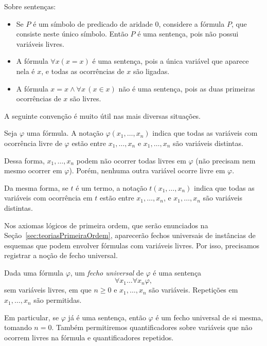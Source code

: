 \begin{example}\label{exa:sentencas}Sobre sentenças:
\begin{itemize}
        \item Se $P$ é um símbolo de predicado de aridade $0$, considere a fórmula $P$, que consiste neste único símbolo.
        Então $P$ é uma sentença, pois não possui variáveis livres.
    
        \item A fórmula $\forall x (x = x)$ é uma sentença, pois a única variável que aparece nela é $x$, e todas as ocorrências de $x$ são ligadas.
    
        \item A fórmula $x = x \wedge \forall x \,(x \in x)$ não é uma sentença, pois as duas primeiras ocorrências de $x$ são livres.
\end{itemize}
\end{example}

A seguinte convenção é muito útil nas mais diversas situações.

\begin{convention}\label{conv:variaveisLivres}
    Seja $\varphi$ uma fórmula.
    A notação $\varphi(x_1, \dots, x_n)$ indica que todas as variáveis com ocorrência livre de $\varphi$ estão entre $x_1, \dots, x_n$ e $x_1, \dots, x_n$ são variáveis distintas.

    Dessa forma, $x_1, \dots, x_n$ podem não ocorrer todas livres em $\varphi$ (não precisam nem mesmo ocorrer em $\varphi$).
    Porém, nenhuma outra variável ocorre livre em $\varphi$.

    Da mesma forma, se $t$ é um termo, a notação $t(x_1, \dots, x_n)$ indica que todas as variáveis com ocorrência em $t$ estão entre $x_1, \dots, x_n$, e $x_1, \dots, x_n$ são variáveis distintas.
\end{convention}

Nos axiomas lógicos de primeira ordem, que serão enunciados na Seção~\ref{sec:teoriasPrimeiraOrdem}, aparecerão fechos universais de instâncias de esquemas que podem envolver fórmulas com variáveis livres.
Por isso, precisamos registrar a noção de fecho universal.

\begin{metadefinition}\label{mdef:fechoUniversal}
    Dada uma fórmula $\varphi$, um \emph{fecho universal} de $\varphi$ é uma sentença
    \[
        \forall x_1 \dots \forall x_n \varphi,
    \]
    sem variáveis livres, em que $n\geq 0$ e $x_1,\dots,x_n$ são variáveis.
    Repetições em $x_1,\dots,x_n$ são permitidas.

    Em particular, se $\varphi$ já é uma sentença, então $\varphi$ é um fecho universal de si mesma, tomando $n=0$.
    Também permitiremos quantificadores sobre variáveis que não ocorrem livres na fórmula e quantificadores repetidos.
\end{metadefinition}

